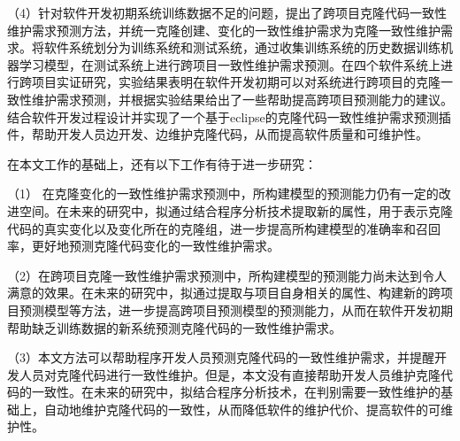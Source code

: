 （4）针对软件开发初期系统训练数据不足的问题，提出了跨项目克隆代码一致性维护需求预测方法，并统一克隆创建、变化的一致性维护需求为克隆一致性维护需求。将软件系统划分为训练系统和测试系统，通过收集训练系统的历史数据训练机器学习模型，在测试系统上进行跨项目一致性维护需求预测。在四个软件系统上进行跨项目实证研究，实验结果表明在软件开发初期可以对系统进行跨项目的克隆一致性维护需求预测，并根据实验结果给出了一些帮助提高跨项目预测能力的建议。结合软件开发过程设计并实现了一个基于eclipse的克隆代码一致性维护需求预测插件，帮助开发人员边开发、边维护克隆代码，从而提高软件质量和可维护性。

在本文工作的基础上，还有以下工作有待于进一步研究：

（1） 在克隆变化的一致性维护需求预测中，所构建模型的预测能力仍有一定的改进空间。在未来的研究中，拟通过结合程序分析技术提取新的属性，用于表示克隆代码的真实变化以及变化所在的克隆组，进一步提高所构建模型的准确率和召回率，更好地预测克隆代码变化的一致性维护需求。

（2）在跨项目克隆一致性维护需求预测中，所构建模型的预测能力尚未达到令人满意的效果。在未来的研究中，拟通过提取与项目自身相关的属性、构建新的跨项目预测模型等方法，进一步提高跨项目预测模型的预测能力，从而在软件开发初期帮助缺乏训练数据的新系统预测克隆代码的一致性维护需求。

（3）本文方法可以帮助程序开发人员预测克隆代码的一致性维护需求，并提醒开发人员对克隆代码进行一致性维护。但是，本文没有直接帮助开发人员维护克隆代码的一致性。在未来的研究中，拟结合程序分析技术，在判别需要一致性维护的基础上，自动地维护克隆代码的一致性，从而降低软件的维护代价、提高软件的可维护性。